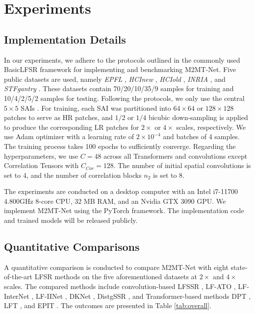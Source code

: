 \section{Experiments}

\subsection{Implementation Details}

In our experiments, we adhere to the protocols outlined in the commonly used BasicLFSR framework \cite{BasicLFSR} for implementing and benchmarking M2MT-Net. Five public datasets are used, namely \textit{EPFL} \cite{rerabekEPFL2016}, \textit{HCInew} \cite{honauerHCInew_ACCV2016}, \textit{HCIold} \cite{wannerHCIold_VMV2013}, \textit{INRIA} \cite{lependuINRIA_TIP2018}, and \textit{STFgantry} \cite{vaishSTFgantry_2008}. These datasets contain 70/20/10/35/9 samples for training and 10/4/2/5/2 samples for testing. Following the protocols, we only use the central $5 \times 5$ SAIs \cite{BasicLFSR}. For training, each SAI was partitioned into $64 \times 64$ or $128 \times 128$ patches to serve as HR patches, and $1/2$ or $1/4$ bicubic down-sampling is applied to produce the corresponding LR patches for $2 \times$ or $4 \times$ scales, respectively. We use Adam optimizer with a learning rate of $2 \times 10^{-4}$ and batches of 4 samples. The training process takes 100 epochs to sufficiently converge. Regarding the hyperparameters, we use $C=48$ across all Transformers and convolutions except Correlation Tensors with $C_{Cor} = 128$. The number of initial spatial convolutions is set to 4, and the number of correlation blocks $n_2$ is set to 8.

The experiments are conducted on a desktop computer with an Intel i7-11700 4.800GHz 8-core CPU, 32 MB RAM, and an Nvidia GTX 3090 GPU. We implement M2MT-Net using the PyTorch framework. The implementation code and trained models will be released publicly.

\subsection{Quantitative Comparisons}
A quantitative comparison is conducted to compare M2MT-Net with eight state-of-the-art LFSR methods on the five aforementioned datasets at $2 \times$ and $4 \times$ scales. The compared methods include convolution-based LFSSR \cite{yeungSAS_LFSR2019}, LF-ATO \cite{jinLFSSRATO_2020}, LF-InterNet \cite{wangLfInterNet_ECCV2020}, LF-IINet \cite{liuLFIINet_TMM2021}, DKNet \cite{huDKNet_TIM2022}, DistgSSR \cite{wangDistgSSR_TIP2022}, and Transformer-based methods DPT \cite{wangDPT_AAAI2022}, LFT \cite{liangLFT_SPL2022}, and EPIT \cite{liangEPIT_arXiv2023}. The outcomes are presented in Table \ref{tab:overall}.

